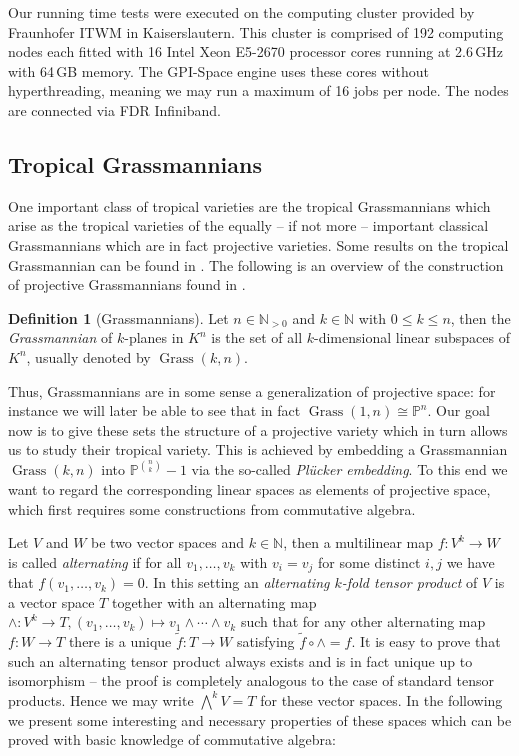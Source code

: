 \documentclass[
  paper=a4,
  titlepage,
  bibliography=totoc,
  pagesize=pdftex
]{scrartcl}
\numberwithin{figure}{section}
\numberwithin{equation}{section}
\numberwithin{table}{section}
\newcommand*\setN{\mathds{N}}
\newcommand*\setP{\mathds{P}}
\DeclareMathOperator{\Grass}{Grass}
\theoremstyle{definition}
\newtheorem{definition}{Definition}
\numberwithin{definition}{section}
\begin{document}
Our running time tests were executed on the computing cluster provided by Fraunhofer ITWM
in Kaiserslautern. This cluster is comprised of 192 computing nodes each fitted with 16
Intel Xeon E5-2670 processor cores running at 2.6\,GHz with 64\,GB memory. The GPI-Space
engine uses these cores without hyperthreading, meaning we may run a maximum of 16 jobs
per node. The nodes are connected via FDR Infiniband.

\subsection{Tropical Grassmannians}
\label{sec:grass}

One important class of tropical varieties are the tropical Grassmannians which arise as
the tropical varieties of the equally -- if not more -- important classical Grassmannians
which are in fact projective varieties. Some results on the tropical Grassmannian can be
found in \cite{tropGrass}. The following is an overview of the construction of projective
Grassmannians found in \cite[Section~8]{gathmAlgGeo}.

\begin{definition}[Grassmannians]
  Let $n \in \setN_{>0}$ and $k \in \setN$ with $0 \leq k \leq n$, then the
  \emph{Grassmannian} of $k$-planes in $K^n$ is the set of all $k$-dimensional linear
  subspaces of $K^n$, usually denoted by $\Grass(k, n)$.
\end{definition}

Thus, Grassmannians are in some sense a generalization of projective space: for instance
we will later be able to see that in fact $\Grass(1,n) \cong \setP^n$. Our goal now is to
give these sets the structure of a projective variety which in turn allows us to study
their tropical variety. This is achieved by embedding a Grassmannian $\Grass(k, n)$ into
$\setP^{\binom nk}-1$ via the so-called \emph{Plücker embedding}. To this end we want to
regard the corresponding linear spaces as elements of projective space, which first
requires some constructions from commutative algebra.

Let $V$ and $W$ be two vector spaces and $k\in\setN$, then a multilinear map $f : V^k \to
W$ is called \emph{alternating} if for all $v_1, \dots, v_k$ with $v_i=v_j$ for some
distinct $i,j$ we have that $f(v_1, \dots, v_k) = 0$. In this setting an \emph{alternating
$k$-fold tensor product} of $V$ is a vector space $T$ together with an alternating map
$\wedge:V^k\to T, (v_1, \dots, v_k) \mapsto v_1\wedge\cdots\wedge v_k$ such that for any
other alternating map $f:W\to T$ there is a unique $\tilde f:T\to W$ satisfying $\tilde f
\circ \wedge = f$. It is easy to prove that such an alternating tensor product always
exists and is in fact unique up to isomorphism -- the proof is completely analogous to the
case of standard tensor products. Hence we may write $\bigwedge^k V = T$ for these vector
spaces. In the following we present some interesting and necessary properties of these
spaces which can be proved with basic knowledge of commutative algebra:
\end{document}

